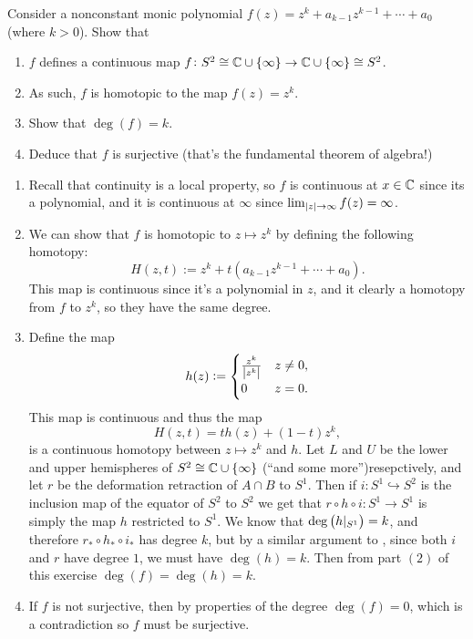 \documentclass[11pt,a4paper]{article}
\begin{document}
\begin{exercise}
  Consider a nonconstant monic polynomial
  $f(z) = z^k + a_{k-1} z^{k-1} + \cdots + a_0$ (where $k > 0$).
  Show that
  \begin{enumerate}
    \item[(1)] $f$ defines a continuous map $f \colon
      S^2 \cong \mathbb{C} \cup \left\{\infty\right\} \to \mathbb{C} \cup \left\{\infty\right\} \cong S^2$.
    \item[(2)] As such, $f$ is homotopic to the map $f(z) = z^k$.
    \item[(3)] Show that $\deg(f) = k$.
    \item[(4)] Deduce that $f$ is surjective (that's the fundamental theorem
      of algebra!)
  \end{enumerate}
\end{exercise}
\begin{solution} \phantom{}
  \begin{enumerate}
    \item[(1)] Recall that continuity is a local property,
      so $f$ is continuous at $x \in \mathbb{C}$ since its a polynomial,
      and it is continuous at $\infty$ since
      $\lim_{\left\lvert z\right\rvert \to \infty} f(z) = \infty$.
    \item[(2)] We can show that $f$ is homotopic to $z \mapsto z^k$
      by defining the following homotopy:
      \[
        H(z,t) := z^k + t(a_{k-1} z^{k-1} + \cdots + a_0).
      \]
      This map is continuous since it's a polynomial in $z$,
      and it clearly a homotopy from $f$ to $z^k$,
      so they have the same degree.
    \item[(3)] Define the map
      \[
        h(z) :=
        \begin{cases}
          \frac{z^k}{\left\lvert z^k\right\rvert} &z \neq 0, \\
          0 &z = 0.
        \end{cases}
      \]
      This map is continuous and thus the map
      \[
        H(z,t) = t h(z) + (1 - t) z^k,
      \]
      is a continuous homotopy between $z \mapsto z^k$ and $h$.
      Let $L$ and $U$ be the lower and upper hemispheres of
      $S^2 \cong \mathbb{C} \cup \left\{\infty\right\}$ (``and some more'')resepctively,
      and let $r$ be the deformation retraction of $A \cap B$ to $S^1$.
      Then if $i \colon S^1 \hookrightarrow S^2$ is the inclusion map
      of the equator of $S^2$ to $S^2$ we get that
      $r \circ h \circ i \colon S^1 \to S^1$ is simply the map
      $h$ restricted to $S^1$.
      We know that $\deg\del{h\vert_{S^1}} = k$,
      and therefore $r_* \circ h_* \circ i_*$ has degree $k$,
      but by a similar argument to ,
      since both $i$ and $r$ have degree $1$,
      we must have $\deg(h) = k$.
      Then from part $(2)$ of this exercise $\deg(f) = \deg(h) = k$.
    \item[(4)] If $f$ is not surjective,
      then by properties of the degree $\deg(f) = 0$,
      which is a contradiction so $f$ must be surjective.
  \end{enumerate}
\end{solution}
\end{document}
